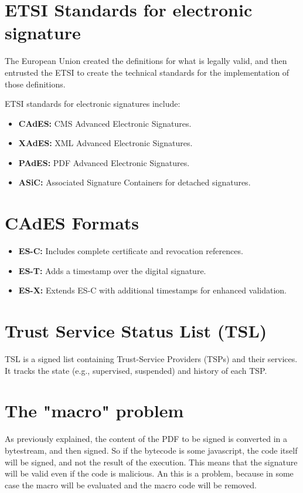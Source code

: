 \section{ETSI Standards for electronic signature}
The European Union created the definitions for what is legally valid,
and then entrusted the ETSI to create the technical standards for the
implementation of those definitions.

ETSI standards for electronic signatures include:
\begin{itemize}
    \item \textbf{CAdES:} CMS Advanced Electronic Signatures.
    \item \textbf{XAdES:} XML Advanced Electronic Signatures.
    \item \textbf{PAdES:} PDF Advanced Electronic Signatures.
    \item \textbf{ASiC:} Associated Signature Containers for detached signatures.
\end{itemize}

\section{CAdES Formats}
\begin{itemize}
    \item \textbf{ES-C:} Includes complete certificate and revocation references.
    \item \textbf{ES-T:} Adds a timestamp over the digital signature.
    \item \textbf{ES-X:} Extends ES-C with additional timestamps for enhanced validation.
\end{itemize}


\section{Trust Service Status List (TSL)}
TSL is a signed list containing Trust-Service Providers (TSPs) and their services. It tracks the state (e.g., supervised, suspended) and history of each TSP.

\section{The "macro" problem}
As previously explained, the content of the PDF to be signed is
converted in a bytestream, and then signed. So if the bytecode is some
javascript, the code itself will be signed, and not the result of the
execution. This means that the signature will be valid even if the 
code is malicious. An this is a problem, because in some case the
macro will be evaluated and the macro code will be removed.

